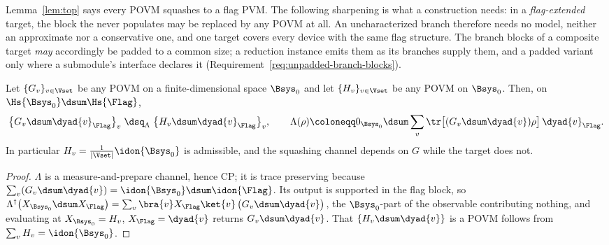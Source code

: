 
Lemma~\ref{lem:top} says every POVM squashes to a flag PVM. The following
sharpening is what a construction needs: in a \emph{flag-extended} target, the
block the  never populates may be replaced by any POVM
at all. An uncharacterized branch therefore needs no model, neither an
approximate nor a conservative one, and one target covers every device with
the same flag structure. The branch blocks of a composite target \emph{may}
accordingly be padded to a common size; a reduction instance emits them as its
branches supply them, and a padded variant only where a submodule's interface
declares it (Requirement~\ref{req:unpadded-branch-blocks}).

\begin{corollary}\label{cor:flagsenough}
Let $\{G_v\}_{v\in\Vset}$ be any POVM on a finite-dimensional space
$\Bsys_0$ and let $\{H_v\}_{v\in\Vset}$ be any POVM on $\Bsys_0$. Then, on
$\Hs{\Bsys_0}\dsum\Hs{\Flag}$,
\begin{equation}\label{eq:flagsenough}
  \big\{G_v\dsum\dyad{v}_{\Flag}\big\}_v
  \;\dsq_{\Lambda}\;
  \big\{H_v\dsum\dyad{v}_{\Flag}\big\}_v,
  \qquad
  \Lambda(\rho)\coloneqq
   0_{\Bsys_0}\dsum\sum_v\tr\big[(G_v\dsum\dyad{v})\rho\big]\,\dyad{v}_{\Flag}.
\end{equation}
In particular $H_v=\tfrac{1}{|\Vset|}\idon{\Bsys_0}$ is admissible, and the
squashing channel depends on $G$ while the target does not.
\end{corollary}

\begin{proof}
$\Lambda$ is a measure-and-prepare channel, hence CP; it is trace preserving
because $\sum_v(G_v\dsum\dyad{v})=\idon{\Bsys_0}\dsum\idon{\Flag}$. Its output
is supported in the flag block, so
$\Lambda^{\dagger}\big(X_{\Bsys_0}\dsum X_{\Flag}\big)
=\sum_v\bra{v}X_{\Flag}\ket{v}\,\big(G_v\dsum\dyad{v}\big)$, the
$\Bsys_0$-part of the observable contributing nothing, and evaluating at
$X_{\Bsys_0}=H_v$, $X_{\Flag}=\dyad{v}$ returns $G_v\dsum\dyad{v}$. That
$\{H_v\dsum\dyad{v}\}$ is a POVM follows from $\sum_vH_v=\idon{\Bsys_0}$.
\end{proof}
